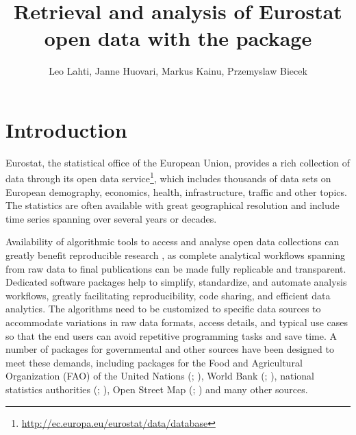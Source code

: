 \title{Retrieval and analysis of Eurostat open data with the  package}
\author{Leo Lahti, Janne Huovari, Markus Kainu, Przemyslaw Biecek}

\maketitle



\section{Introduction}

Eurostat, the statistical
office of the European Union, provides a rich collection of data
through its open data service\footnote{\url{http://ec.europa.eu/eurostat/data/database}}, which includes thousands of data sets
on European demography, economics, health, infrastructure, traffic and
other topics. The statistics are often available with great
geographical resolution and include time series spanning over several
years or decades.

Availability of algorithmic tools to access and analyse open data
collections can greatly benefit reproducible
research \citep{Gandrud13, Boettiger2015}, as complete analytical
workflows spanning from raw data to final publications can be made
fully replicable and transparent. Dedicated software packages help to
simplify, standardize, and automate analysis workflows, greatly
facilitating reproducibility, code sharing, and efficient data
analytics. The algorithms need to be customized to specific data
sources to accommodate variations in raw data formats, access details,
and typical use cases so that the end users can avoid repetitive
programming tasks and save time. A number of packages for governmental
and other sources have been designed to meet these demands, including
packages for the Food and Agricultural Organization (FAO) of the
United Nations (; \cite{FAOSTAT}), World Bank
(; \cite{WDI}), national statistics authorities
(; \cite{pxweb}), Open Street Map
(; \cite{osmar}) and many other sources.

